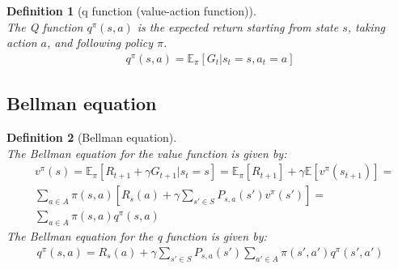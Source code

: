 \documentclass[11pt]{book} %
\newtheorem{definition}{Definition}[section]
\begin{document}
\begin{definition}[q function (value-action function)]\ \\
    The Q function $q^{\pi}(s, a)$ is the expected return starting from state $s$, taking action $a$, and following policy $\pi$.
    \begin{align*}
        q^{\pi}(s, a) = \mathbb{E}_{\pi} \left[ G_t | s_t = s, a_t = a \right]
    \end{align*}
\end{definition}


\subsection{Bellman equation}
\begin{definition}[Bellman equation]\ \\
    The Bellman equation for the value function is given by:
    \begin{align*}
        &v^{\pi}(s) = \mathbb{E}_{\pi} \left[ R_{t+1} + \gamma G_{t+1} | s_t = s \right] = \mathbb{E}_{\pi} \left[ R_{t+1} \right] + \gamma \mathbb{E} \left[ v^{\pi}(s_{t+1}) \right]  = \\
        &\sum_{a \in A} \pi(s, a) \left[ R_s(a) + \gamma \sum_{s' \in S} P_{s,a}(s') v^{\pi}(s') \right] = \\
        &\sum_{a \in A} \pi(s, a) q^{\pi}(s, a)
    \end{align*}
    The Bellman equation for the q function is given by:
    \begin{align*}
        q^{\pi}(s, a) = R_s(a) + \gamma \sum_{s' \in S} P_{s,a}(s') \sum_{a' \in A} \pi(s', a') q^{\pi}(s', a')
    \end{align*}
\end{definition}
\end{document}
